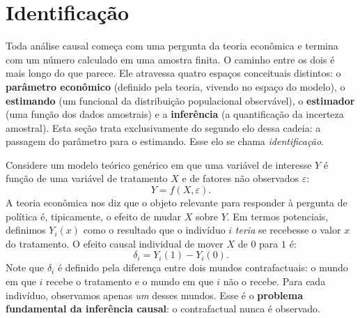 
\chapter{Identificação}
\label{cap:identificacao}
\label{sec:identificacao}

Toda análise causal começa com uma pergunta da teoria econômica e termina com um número calculado em uma amostra finita. O caminho entre os dois é mais longo do que parece. Ele atravessa quatro espaços conceituais distintos: o \textbf{parâmetro econômico} (definido pela teoria, vivendo no espaço do modelo), o \textbf{estimando} (um funcional da distribuição populacional observável), o \textbf{estimador} (uma função dos dados amostrais) e a \textbf{inferência} (a quantificação da incerteza amostral). Esta seção trata exclusivamente do segundo elo dessa cadeia: a passagem do parâmetro para o estimando. Esse elo se chama \textit{identificação}.

Considere um modelo teórico genérico em que uma variável de interesse $Y$ é função de uma variável de tratamento $X$ e de fatores não observados $\varepsilon$:
\begin{equation}
Y = f(X, \varepsilon).
\label{eq:modelo-generico}
\end{equation}
A teoria econômica nos diz que o objeto relevante para responder à pergunta de política é, tipicamente, o efeito de mudar $X$ sobre $Y$. Em termos potenciais, definimos $Y_i(x)$ como o resultado que o indivíduo $i$ \textit{teria} se recebesse o valor $x$ do tratamento. O efeito causal individual de mover $X$ de $0$ para $1$ é:
\begin{equation}
\delta_i = Y_i(1) - Y_i(0).
\label{eq:efeito-individual}
\end{equation}
Note que $\delta_i$ é definido pela diferença entre dois mundos contrafactuais: o mundo em que $i$ recebe o tratamento e o mundo em que $i$ não o recebe. Para cada indivíduo, observamos apenas \textit{um} desses mundos. Esse é o \textbf{problema fundamental da inferência causal}: o contrafactual nunca é observado.


